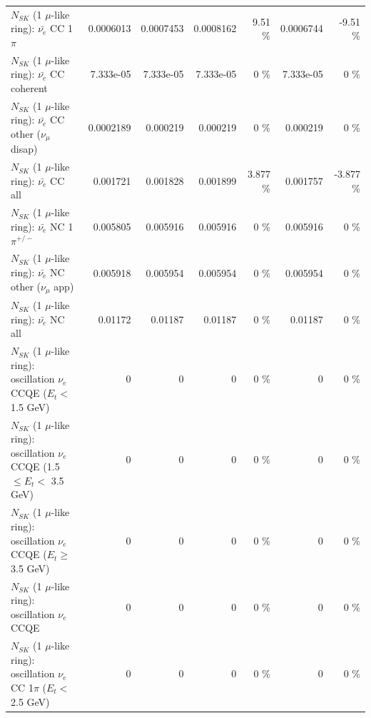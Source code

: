 \begin{table}
\begin{tabular}{| l | r | r | r  r | r  r |}
\hline
                           $N_{SK}$ (1 $\mu$-like ring): $\bar{\nu_e}$ CC 1$\pi$ &       0.0006013 &       0.0007453 &       0.0008162 &     9.51 \%  &       0.0006744 &    -9.51 \%  \\ 
                         $N_{SK}$ (1 $\mu$-like ring): $\bar{\nu_e}$ CC coherent &       7.333e-05 &       7.333e-05 &       7.333e-05 &        0 \%  &       7.333e-05 &        0 \%  \\ 
          $N_{SK}$ (1 $\mu$-like ring): $\bar{\nu_e}$ CC other ($\nu_\mu$ disap) &       0.0002189 &        0.000219 &        0.000219 &        0 \%  &        0.000219 &        0 \%  \\ 
                            $N_{SK}$ (1 $\mu$-like ring): $\bar{\nu_{e}}$ CC all &        0.001721 &        0.001828 &        0.001899 &    3.877 \%  &        0.001757 &   -3.877 \%  \\ 
\hline
                     $N_{SK}$ (1 $\mu$-like ring): $\bar{\nu_e}$ NC 1$\pi^{+/-}$ &        0.005805 &        0.005916 &        0.005916 &        0 \%  &        0.005916 &        0 \%  \\ 
            $N_{SK}$ (1 $\mu$-like ring): $\bar{\nu_e}$ NC other ($\nu_\mu$ app) &        0.005918 &        0.005954 &        0.005954 &        0 \%  &        0.005954 &        0 \%  \\ 
                            $N_{SK}$ (1 $\mu$-like ring): $\bar{\nu_{e}}$ NC all &         0.01172 &         0.01187 &         0.01187 &        0 \%  &         0.01187 &        0 \%  \\ 
\hline
\hline
\hline
      $N_{SK}$ (1 $\mu$-like ring): oscillation $\nu_e$ CCQE ($E_{t} <$ 1.5 GeV) &               0 &               0 &               0 &        0 \%  &               0 &        0 \%  \\ 
$N_{SK}$ (1 $\mu$-like ring): oscillation $\nu_e$ CCQE (1.5 $\leq E_{t} <$ 3.5 GeV) &               0 &               0 &               0 &        0 \%  &               0 &        0 \%  \\ 
   $N_{SK}$ (1 $\mu$-like ring): oscillation $\nu_e$ CCQE ($E_{t} \geq$ 3.5 GeV) &               0 &               0 &               0 &        0 \%  &               0 &        0 \%  \\ 
\hline
                          $N_{SK}$ (1 $\mu$-like ring): oscillation $\nu_e$ CCQE &               0 &               0 &               0 &        0 \%  &               0 &        0 \%  \\ 
\hline
 $N_{SK}$ (1 $\mu$-like ring): oscillation $\nu_e$ CC 1$\pi$ ($E_{t} <$ 2.5 GeV) &               0 &               0 &               0 &        0 \%  &               0 &        0 \%  \\ 

\end{tabular}
\end{table}
